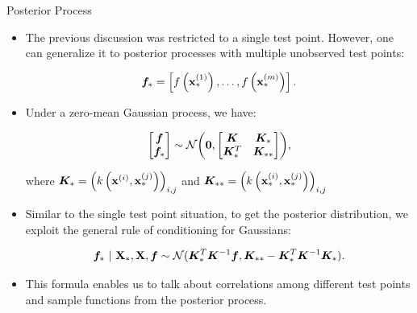 \begin{frame}[c,allowframebreaks]{Posterior Process}

\begin{itemize}
\item The previous discussion was restricted to a single test point. However, one can generalize it to posterior processes with multiple unobserved test points:
  
$$\bm{f}_* = \left[f\left(\mathbf{x}^{(1)}_*\right),\dots, f\left(\mathbf{x}^{(m)}_*\right)\right].$$ 


\lz

\item Under a zero-mean Gaussian process, we have:

$$\begin{bmatrix}\bm{f} \\
\bm{f}_*\end{bmatrix}\sim  
\mathcal{N}\biggl(\bm{0}, \begin{bmatrix} \bm{K} & \bm{K}_* \\ \bm{K}_*^T & \bm{K}_{**}\end{bmatrix}\biggr),$$

where $\bm{K}_* = \left(k\left(\mathbf{x}^{(i)}, \mathbf{x}^{(j)}_*\right)\right)_{i,j}$ and $\bm{K}_{**} = \left(k\left(\mathbf{x}^{(i)}_*, \mathbf{x}^{(j)}_*\right)\right)_{i,j}$ 

\end{itemize}

\framebreak

\begin{itemize}

  \item Similar to the single test point situation, to get the posterior distribution, we exploit the general rule of conditioning for Gaussians:
  
  \begin{eqnarray*}
    \bm{f}_* ~|~ \mathbf{X}_*, \mathbf{X}, \bm{f} \sim \mathcal{N}(\bm{K}_{*}^{T}\bm{K}^{-1}\bm{f}, \bm{K}_{**} - \bm{K}_*^T \bm{K} ^{-1}\bm{K}_*).
  \end{eqnarray*}  
  
\lz

  \item This formula enables us to talk about correlations among different test points and sample functions from the posterior process. 
\end{itemize}


\end{frame}

